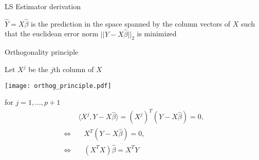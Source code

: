 \documentclass[compress, smaller, serif, 9pt]{beamer}
\begin{document}
\begin{frame}{LS Estimator derivation}


$\widehat{Y}= X \widehat{\beta}$ is the prediction in the space spanned by the column vectors of $X$
such that the euclidean error norm  $|| Y - X \widehat{\beta}||_2$ is minimized

\begin{block}{Orthogonality principle}

Let $X^j$ be the $j$th column of $X$ \medskip \\
\begin{minipage}{.42\textwidth}
\begin{center}
\texttt{[image: orthog\_principle.pdf]}
\end{center}
\end{minipage} \hfill
\begin{minipage}{.55\textwidth}
 for $j=1,\ldots,p+1$
 \begin{align*}
   & \ \langle X^j,Y-X \widehat{\beta} \rangle = (X^j)^T \left(Y- X \widehat{\beta}\right)= 0,\\
   \Leftrightarrow & \quad X^T  \left(Y- X \widehat{\beta}\right)= 0,\\
   \Leftrightarrow  &  \quad\left( X^T X \right)  \widehat{\beta}= X^T Y
 \end{align*}
\end{minipage}

 \end{block}

\end{frame}
\end{document}
